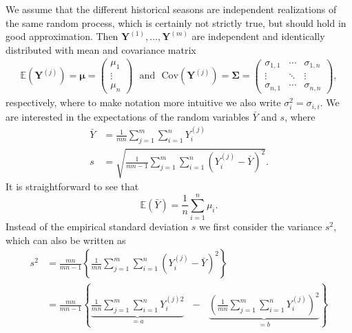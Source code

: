 \documentclass{article}
\newcommand{\sd}{s}
\newcommand{\mean}{\bar{Y}}
\begin{document}
We assume that the different historical seasons are independent realizations of the same random process, which is certainly not strictly true, but should hold in good approximation. Then $\mathbf{Y}^{(1)}, \dots, \mathbf{Y}^{(m)}$ are independent and identically distributed with mean and covariance matrix
\begin{align}
\mathbb{E}(\mathbf{Y}^{(j)}) = \boldsymbol{\mu} = \left(\begin{array}{c}
\mu_1\\
\vdots\\
\mu_n
\end{array}\right) \ \ \ \text{and} \ \ \ \text{Cov}(\mathbf{Y}^{(j)}) = \boldsymbol{\Sigma} =
\left(\begin{array}{ccc}
\sigma_{1, 1} & \cdots & \sigma_{1, n}\\
\vdots & \ddots &\vdots\\
\sigma_{n, 1} & \cdots & \sigma_{n, n}
\end{array}\right),
\end{align}
respectively, where to make notation more intuitive we also write $\sigma^2_i = \sigma_{i, i}$. We are interested in the expectations of the random variables $\mean$ and $\sd$, where
\begin{align*}
\mean & = \frac{1}{mn} \sum_{j = 1}^m \sum_{i = 1}^n Y_i^{(j)}\\
\sd & = \sqrt{\frac{1}{mn - 1} \sum_{j = 1}^m \sum_{i = 1}^n \left(Y_i^{(j)} - \mean\right)^2}.
\end{align*}
It is straightforward to see that 
\begin{equation}
\mathbb{E}(\mean) = \frac{1}{n} \sum_{i = 1}^n \mu_i.
\label{eq:expectation_mu}
\end{equation}
Instead of the empirical standard deviation $\sd$ we first consider the variance $\sd^2$, which can also be written as
\begin{align}
\sd^2 & = \frac{mn}{mn - 1} \left\{\frac{1}{mn} \sum_{j = 1}^m \sum_{i = 1}^n \left(Y_i^{(j)} - \mean\right)^2 \right\}\\
& = \frac{mn}{mn - 1} \left\{ \underbrace{\frac{1}{mn} \sum_{j = 1}^m \sum_{i = 1}^n Y_i^{(j)2}}_{= a} \ \ \ - \ \ \ \underbrace{\left(\frac{1}{mn} \sum_{j = 1}^m \sum_{i = 1}^n Y_i^{(j)} \right)^2}_{= b} \right\} \label{eq:sigma2hat}
\end{align}
\end{document}
